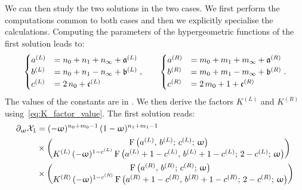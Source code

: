 We can then study the two solutions in the two cases.
We first perform the computations common to both cases and then we explicitly specialise the calculations.
Computing the parameters of the hypergeometric functions of the first solution leads to:
\begin{equation}
  \begin{cases}
    a^{(L)} & = n_{0} + n_{1} + n_{\infty} + \mathfrak{a}^{(L)}
    \\
    b^{(L)} & = n_{0} + n_{1} - n_{\infty} + \mathfrak{b}^{(L)}
    \\
    c^{(L)} & = 2\, n_{0} + \mathfrak{c}^{(L)}
  \end{cases},
  \qquad
  \begin{cases}
    a^{(R)} & = m_{0} + m_{1} + m_{\infty} + \mathfrak{a}^{(R)}
    \\
    b^{(R)} & = m_{0} + m_{1} - m_{\infty} + \mathfrak{b}^{(R)}
    \\
    c^{(R)} & = 2\, m_{0} + 1 + \mathfrak{c}^{(R)}
  \end{cases}.
\end{equation}
The values of the constants are in .
We then derive the factors $K^{(L)}$ and $K^{(R)}$ using~\eqref{eq:K_factor_value}.
The first solution reads:
\begin{equation}
  \begin{split}
    \ipd{\omega} \cX_1
    & =
    (-\omega)^{n_{0} + m_{0} - 1}\,
    (1-\omega)^{n_{1} + m_{1} - 1}\,
    \\
    & \times
    \mqty(
      \hyp{a^{(L)}}{b^{(L)}}{c^{(L)}}{\omega}
      \\
      K^{(L)}\, (-\omega)^{1 - c^{(L)}}\,
      \hyp{a^{(L)} + 1 - c^{(L)}}{b^{(L)} + 1 - c^{(L)}}{2 - c^{(L)}}{\omega}
    )
    \\
    & \times
    \mqty(
      \hyp{a^{(R)}}{b^{(R)}}{c^{(R)}}{\omega}
      \\
      K^{(R)}\, (-\omega)^{1 - c^{(R)}}\,
      \hyp{a^{(R)} + 1 - c^{(R)}}{b^{(R)} + 1 - c^{(R)}}{2 - c^{(R)}}{\omega}
    )
  \end{split}
  \label{eq:first_solution}
\end{equation}

